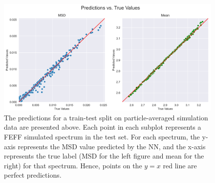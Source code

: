 \begin{figure}
    \centering
    \includegraphics[width=\linewidth]{Chapters/Figures/nn_rdf_validation_preds-fixed-just-msd-and-mean.png}
    \caption[Simulation Test Set Predictions]{The predictions for a train-test split on particle-averaged simulation data are presented above. Each point in each subplot represents a FEFF simulated spectrum in the test set. For each spectrum, the y-axis represents the MSD value predicted by the NN, and the x-axis represents the true label (MSD for the left figure and mean for the right) for that spectrum. Hence, points on the $ y=x $ red line are perfect predictions.}
    \label{fig:train-test-split-just-msd-and-mean}
\end{figure}
